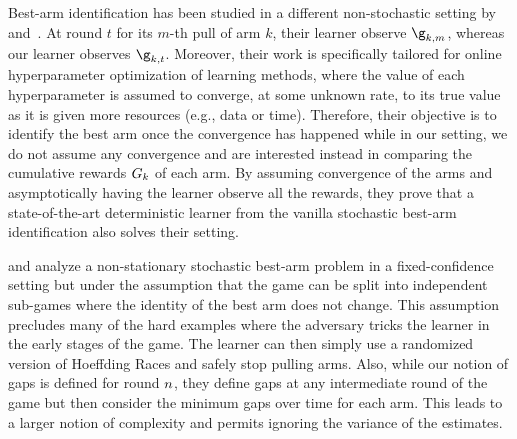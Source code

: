 Best-arm identification has been studied in a different
non-stochastic setting by~\cite{Jamieson16NS} and~\cite{Li16HA}. 
At round $t$ for its $m$-th pull of arm $k$, 
their learner observe $\gainVector_{k,m}$, whereas
our learner  observes $\gainVector_{k,t}$.
Moreover, their work %
is specifically tailored for online hyperparameter 
optimization of learning methods, where the value of each 
hyperparameter is assumed to converge, at some unknown rate, 
to its true value as it is given more resources (e.g., data or time). 
Therefore, their objective is to identify the best arm once the 
convergence has happened while in our setting, we do not assume 
any convergence and are interested instead in comparing the 
cumulative rewards $G_k$ of each arm. By assuming 
convergence of the arms and asymptotically having the learner 
observe all the rewards, they prove that a state-of-the-art deterministic learner from the vanilla stochastic best-arm identification also solves their setting.



\cite{Allesiardo2017SL} and \cite{Allesiardo17NS} analyze
a non-stationary stochastic best-arm problem in a fixed-confidence 
setting but under the assumption that the game can be split into independent
sub-games where the identity of the best arm does not change. This 
assumption precludes many of the hard examples where the adversary 
tricks the learner in the early stages of the game. The
learner can then simply use a randomized version
of Hoeffding Races and safely stop pulling arms. 
Also, while our notion of gaps is defined for round $n$, 
they define gaps at any intermediate round of the game 
but then consider the minimum gaps over time for each arm.
This leads to a larger notion of complexity and permits ignoring the variance of the estimates.
\vspace{.2cm}

